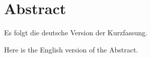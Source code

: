 
\thispagestyle{plain}

\section*{Abstract}



Es folgt die deutsche Version der Kurzfassung.

Here is the English version of the Abstract.
